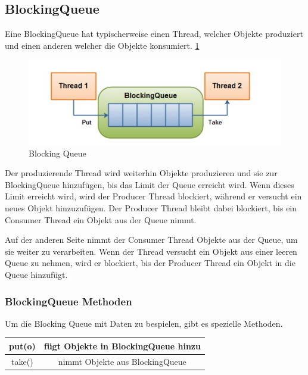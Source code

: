 \subsection{BlockingQueue}

Eine BlockingQueue hat typischerweise einen Thread, welcher Objekte produziert und einen anderen welcher die Objekte konsumiert. \ref{fig:impl:BlockingQueue}

\begin{figure}
    \centering
    \includegraphics[scale=0.5]{pics/blockingQueue.jpg}
    \caption{Blocking Queue}
    \label{fig:impl:BlockingQueue}
\end{figure}

Der produzierende Thread wird weiterhin Objekte produzieren und sie zur BlockingQueue hinzufügen, bis das Limit der Queue erreicht wird. Wenn dieses Limit erreicht wird, wird der Producer Thread blockiert, während er versucht ein neues Objekt hinzuzufügen.  Der Producer Thread bleibt dabei blockiert, bis ein Consumer Thread ein Objekt aus der Queue nimmt. 

Auf der anderen Seite nimmt der Consumer Thread Objekte aus der Queue, um sie weiter zu verarbeiten.  Wenn der Thread versucht ein Objekt aus einer leeren Queue zu nehmen, wird er blockiert, bis der Producer Thread ein Objekt in die Queue hinzufügt. 

\subsubsection{BlockingQueue Methoden}
Um die Blocking Queue mit Daten zu bespielen, gibt es spezielle Methoden. 

\begin{center}
    \begin{tabular}{ |c|c| } 
     \hline
     put(o) & fügt Objekte in BlockingQueue hinzu \\ 
     \hline
     take() & nimmt Objekte aus BlockingQueue \\ 
     \hline
    \end{tabular}
    \end{center}

